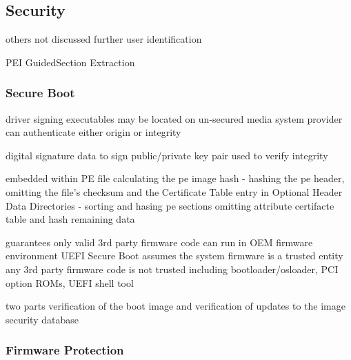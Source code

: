 
\subsection{Security}

others not discussed further
user identification

PEI
GuidedSection Extraction


\subsubsection{Secure Boot}

\cite{tianocore-understanding-uefi-secure-boot-chain}

driver signing
executables may be located on un-secured media
system provider can authenticate either origin or integrity

digital signature
data to sign
public/private key pair used to verify integrity


embedded within PE file
calculating the pe image hash
- hashing the pe header, omitting the file's checksum and the Certificate Table entry in Optional Header Data Directories
- sorting and hasing pe sections
omitting attribute certifacte table and hash remaining data

\cite{microsoft-pe-signature-format}




guarantees only valid 3rd party firmware code can run in OEM firmware environment
UEFI Secure Boot assumes the system firmware is a trusted entity
any 3rd party firmware code is not trusted
including bootloader/osloader, PCI option ROMs, UEFI shell tool

two parts
verification of the boot image and verification of updates to the image security database
\cite{understanding-uefi-secure-boot-chain}



\subsubsection{Firmware Protection}

